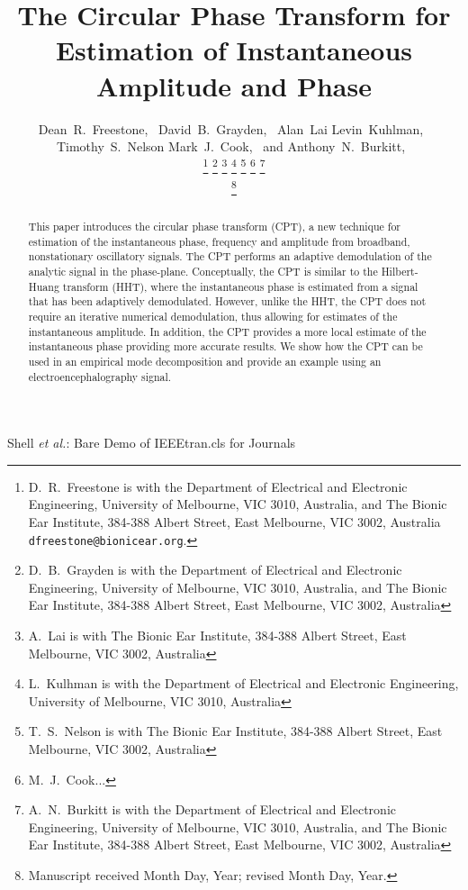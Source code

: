 \documentclass[a4paper]{IEEEtran}
\begin{document}
\title{The Circular Phase Transform for Estimation of Instantaneous Amplitude and Phase}

\author{Dean~R.~Freestone,~
		David~B.~Grayden,~
        Alan~Lai
        Levin~Kuhlman,~
        Timothy~S.~Nelson
        Mark~J.~Cook,~
        and Anthony~N.~Burkitt,~
        

\thanks{D.\ R.\ Freestone is with the Department
of Electrical and Electronic Engineering, University of Melbourne, VIC 3010, Australia, and The Bionic Ear Institute, 384-388 Albert Street, East Melbourne, VIC 3002, Australia {\tt\small dfreestone@bionicear.org}.}  %
\thanks{D.\ B.\ Grayden is with the Department of Electrical and Electronic Engineering, University of Melbourne, VIC 3010, Australia, and The Bionic Ear Institute, 384-388 Albert Street, East Melbourne, VIC 3002, Australia}
\thanks{A.\ Lai is with The Bionic Ear Institute, 384-388 Albert Street, East Melbourne, VIC 3002, Australia}
\thanks{L.\ Kulhman is with the Department of Electrical and Electronic Engineering, University of Melbourne, VIC 3010, Australia}
\thanks{T.\ S.\ Nelson is with The Bionic Ear Institute, 384-388 Albert Street, East Melbourne, VIC 3002, Australia}
\thanks{M.\ J.\ Cook...}
\thanks{A.\ N.\ Burkitt is with the Department of Electrical and Electronic Engineering, University of Melbourne, VIC 3010, Australia, and The Bionic Ear Institute, 384-388 Albert Street, East Melbourne, VIC 3002, Australia}


\thanks{Manuscript received Month Day, Year; revised Month Day, Year.}}


%
{Shell \MakeLowercase{\textit{et al.}}: Bare Demo of IEEEtran.cls for Journals}

\maketitle

\begin{abstract}
This paper introduces the circular phase transform (CPT), a new technique for estimation of the instantaneous phase, frequency and amplitude from broadband, nonstationary oscillatory signals. The CPT performs an adaptive demodulation of the analytic signal in the phase-plane. Conceptually, the CPT is similar to the Hilbert-Huang transform (HHT), where the instantaneous phase is estimated from a signal that has been adaptively demodulated. However, unlike the HHT, the CPT does not require an iterative numerical demodulation, thus allowing for estimates of the instantaneous amplitude. In addition, the CPT provides a more local estimate of the instantaneous phase providing more accurate results. We show how the CPT can be used in an empirical mode decomposition and provide an example using an electroencephalography signal. 
\end{abstract}
\end{document}
